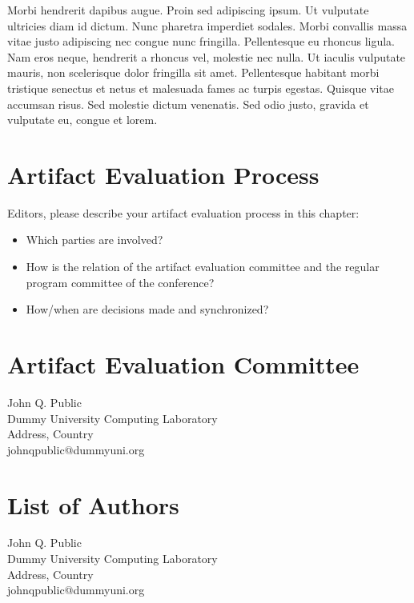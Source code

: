 \documentclass[a4paper,UKenglish]{dartsmaster-v2019}
\begin{document}
Morbi hendrerit dapibus augue. Proin sed adipiscing ipsum. Ut
vulputate ultricies diam id dictum. Nunc pharetra imperdiet
sodales. Morbi convallis massa vitae justo adipiscing nec congue nunc
fringilla. Pellentesque eu rhoncus ligula. Nam eros neque, hendrerit a
rhoncus vel, molestie nec nulla. Ut iaculis vulputate mauris, non
scelerisque dolor fringilla sit amet. Pellentesque habitant morbi
tristique senectus et netus et malesuada fames ac turpis
egestas. Quisque vitae accumsan risus. Sed molestie dictum
venenatis. Sed odio justo, gravida et vulputate eu, congue et lorem. 

\chapter{Artifact Evaluation Process}
Editors, please describe your artifact evaluation process in this chapter:
\begin{itemize}
\item Which parties are involved? 
\item How is the relation of the artifact
evaluation committee and the regular program committee of the conference?
\item How/when are decisions made and synchronized?
\end{itemize}



\begin{participants}

\chapter[Committee]{Artifact Evaluation Committee}
\participant John Q. Public\\ 
  Dummy University Computing Laboratory\\
  Address, Country\\
  johnqpublic@dummyuni.org


\chapter[Authors]{List of Authors}
\participant John Q. Public\\ 
  Dummy University Computing Laboratory\\
  Address, Country\\
  johnqpublic@dummyuni.org

\end{participants} 
\end{document}
